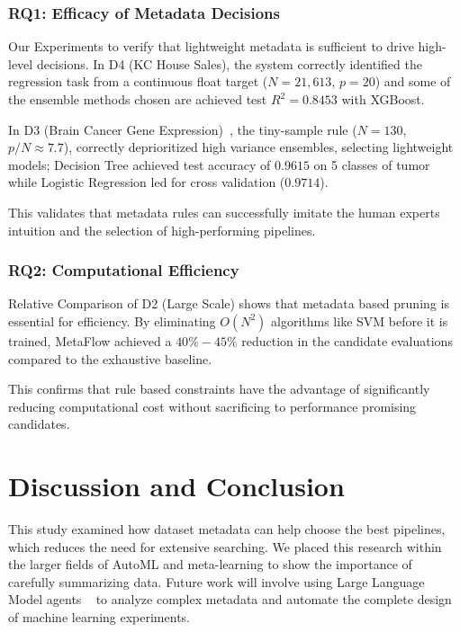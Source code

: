 \documentclass[conference]{llncs}
\begin{document}
   \subsubsection{RQ1: Efficacy of Metadata Decisions} %
   Our Experiments to verify that lightweight metadata is sufficient to drive high-level decisions. In D4 (KC House Sales), the system correctly identified the regression task from a continuous float target ($N = 21,613$, $p = 20$) and some of the ensemble methods chosen are achieved test $R^2 = 0.8453$ with XGBoost. 

In D3 (Brain Cancer Gene Expression)~\cite{feltes2019cumida}, the tiny-sample rule ($N = 130$, $p/N \approx 7.7$), correctly deprioritized high variance ensembles, selecting lightweight models; Decision Tree achieved test accuracy of $0.9615$ on 5 classes of tumor while Logistic Regression led for cross validation ($0.9714$). 

This validates that metadata rules can successfully imitate the human experts intuition and the selection of high-performing pipelines.

   \subsubsection{RQ2: Computational Efficiency} %
   Relative Comparison of D2 (Large Scale) shows that metadata based pruning is essential for efficiency. By eliminating $O(N^2)$ algorithms like SVM before it is trained, MetaFlow achieved a $40\%-45\%$ reduction in the candidate evaluations compared to the exhaustive baseline. 

This confirms that rule based constraints have the advantage of significantly reducing computational cost without sacrificing to performance promising candidates.

   \section{Discussion and Conclusion} %
   \label{sec:conclusion}
   This study examined how dataset metadata can help choose the best pipelines, which reduces the need for extensive searching. We placed this research within the larger fields of AutoML and meta-learning to show the importance of carefully summarizing data. Future work will involve using Large Language Model agents ~\cite{shen2024hugginggpt} to analyze complex metadata and automate the complete design of machine learning experiments.
   

\end{document}
